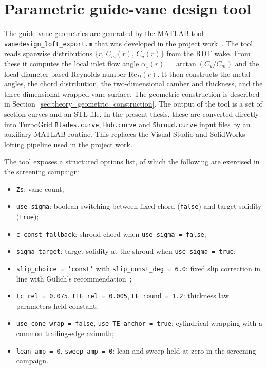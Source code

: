 \section{Parametric guide-vane design tool}
\label{sec:methods_matlab_tool}
 
The guide-vane geometries are generated by the MATLAB tool \texttt{vanedesign\_loft\_export.m} that was developed in the project work~\cite{Leonsen2025}. The tool reads spanwise distributions $\{r,\,C_m(r),\,C_u(r)\}$ from the RDT wake. From these it computes the local inlet flow angle $\alpha_1(r) = \arctan(C_u/C_m)$ and the local diameter-based Reynolds number $\mathrm{Re}_D(r)$. It then constructs the metal angles, the chord distribution, the two-dimensional camber and thickness, and the three-dimensional wrapped vane surface. The geometric construction is described in Section~\ref{sec:theory_geometric_construction}. The output of the tool is a set of section curves and an STL file. In the present thesis, these are converted directly into TurboGrid \texttt{Blades.curve}, \texttt{Hub.curve} and \texttt{Shroud.curve} input files by an auxiliary MATLAB routine. This replaces the Visual Studio and SolidWorks lofting pipeline used in the project work.
 
The tool exposes a structured options list, of which the following are exercised in the screening campaign:
\begin{itemize}
  \item \texttt{Zs}: vane count;
  \item \texttt{use\_sigma}: boolean switching between fixed chord (\texttt{false}) and target solidity (\texttt{true});
  \item \texttt{c\_const\_fallback}: shroud chord when \texttt{use\_sigma = false};
  \item \texttt{sigma\_target}: target solidity at the shroud when \texttt{use\_sigma = true};
  \item \texttt{slip\_choice = 'const'} with \texttt{slip\_const\_deg = 6.0}: fixed slip correction in line with G\"ulich's recommendation~\cite{Gulich2010};
  \item \texttt{tc\_rel = 0.075}, \texttt{tTE\_rel = 0.005}, \texttt{LE\_round = 1.2}: thickness law parameters held constant;
  \item \texttt{use\_cone\_wrap = false}, \texttt{use\_TE\_anchor = true}: cylindrical wrapping with a common trailing-edge azimuth;
  \item \texttt{lean\_amp = 0}, \texttt{sweep\_amp = 0}: lean and sweep held at zero in the screening campaign.
\end{itemize}
 
